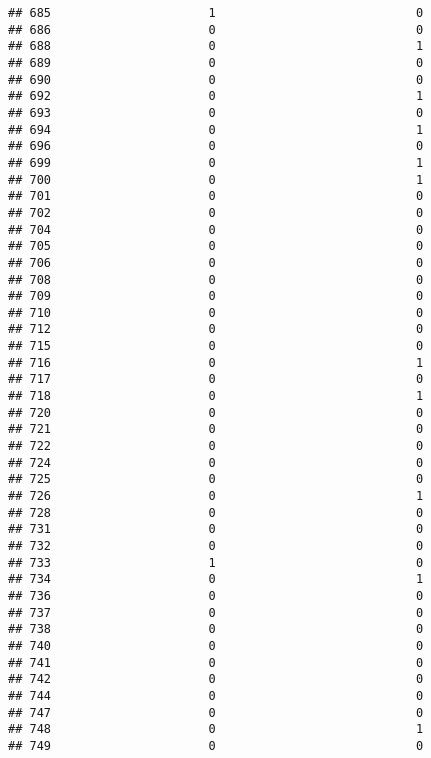 \documentclass[
]{article}
\begin{document}
\begin{verbatim}
## 685                      1                            0
## 686                      0                            0
## 688                      0                            1
## 689                      0                            0
## 690                      0                            0
## 692                      0                            1
## 693                      0                            0
## 694                      0                            1
## 696                      0                            0
## 699                      0                            1
## 700                      0                            1
## 701                      0                            0
## 702                      0                            0
## 704                      0                            0
## 705                      0                            0
## 706                      0                            0
## 708                      0                            0
## 709                      0                            0
## 710                      0                            0
## 712                      0                            0
## 715                      0                            0
## 716                      0                            1
## 717                      0                            0
## 718                      0                            1
## 720                      0                            0
## 721                      0                            0
## 722                      0                            0
## 724                      0                            0
## 725                      0                            0
## 726                      0                            1
## 728                      0                            0
## 731                      0                            0
## 732                      0                            0
## 733                      1                            0
## 734                      0                            1
## 736                      0                            0
## 737                      0                            0
## 738                      0                            0
## 740                      0                            0
## 741                      0                            0
## 742                      0                            0
## 744                      0                            0
## 747                      0                            0
## 748                      0                            1
## 749                      0                            0

\end{verbatim}
\end{document}
